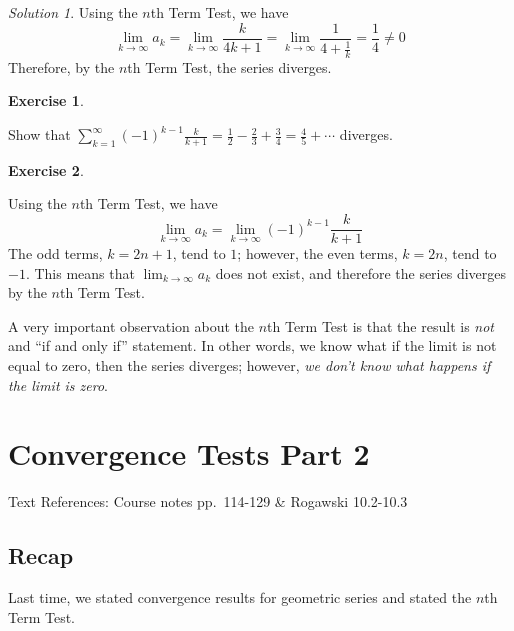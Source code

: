 \documentclass[
]{book}
\theoremstyle{definition}
\theoremstyle{definition}
\theoremstyle{definition}
\newtheorem{exercise}{Exercise}[chapter]
\theoremstyle{definition}
\theoremstyle{remark}
\newtheorem*{solution}{Solution}
\begin{document}
\begin{solution}

Using the \(n\)th Term Test, we have \[\lim_{k\to\infty}a_k = \lim_{k\to\infty}\frac{k}{4k+1} = \lim_{k\to\infty} \frac{1}{4+\frac{1}{k}}=\frac{1}{4} \neq 0\]
Therefore, by the \(n\)th Term Test, the series diverges.

\end{solution}

\begin{exercise}
\protect\hypertarget{exr:unlabeled-div-185}{}\label{exr:unlabeled-div-185}

Show that \(\displaystyle \sum_{k=1}^\infty (-1)^{k-1}\frac{k}{k+1}=\frac{1}{2}-\frac{2}{3}+\frac{3}{4}=\frac{4}{5}+\cdots\) diverges.

\end{exercise}

\begin{exercise}
\protect\hypertarget{exr:unlabeled-div-186}{}\label{exr:unlabeled-div-186}

Using the \(n\)th Term Test, we have \[\lim_{k\to\infty}a_k = \lim_{k\to\infty}(-1)^{k-1}\frac{k}{k+1}\]
The odd terms, \(k=2n+1\), tend to \(1\); however, the even terms, \(k=2n\), tend to \(-1\). This means that \(\displaystyle \lim_{k\to\infty}a_k\) does not exist, and therefore the series diverges by the \(n\)th Term Test.

\end{exercise}

A very important observation about the \(n\)th Term Test is that the result is \emph{not} and ``if and only if'' statement. In other words, we know what if the limit is not equal to zero, then the series diverges; however, \emph{we don't know what happens if the limit is zero}.

\hypertarget{lec-27}{%
\chapter{Convergence Tests Part 2}\label{lec-27}}

Text References: Course notes pp.~114-129 \& Rogawski 10.2-10.3

\hypertarget{recap-25}{%
\section{Recap}\label{recap-25}}

Last time, we stated convergence results for geometric series and stated the \(n\)th Term Test.
\end{document}
